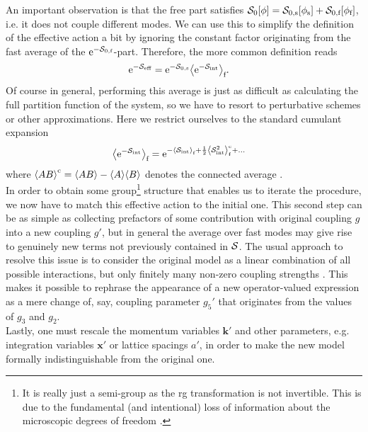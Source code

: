 An important observation is that the free part satisfies $\sact_0[\phi] = \sact_{0,\s}[\phi_\s] + \sact_{0,\f}[\phi_\f]$, i.e. it does not couple different modes.
We can use this to simplify the definition of the effective action a bit by ignoring the constant factor originating from the fast average of the $\powe{-\sact_{0,\f}}$-part.
Therefore, the more common definition reads \cite[]{Bosonization_Shankar_1994} %
\begin{align}
\powe{-\sact_\eff} &= \powe{-\sact_{0,\s}} \bra*{\powe{-\sact_\tint}}_\f. \label{eqn:rg:effective_S_Wilson_def}
\end{align}
Of course in general, performing this average is just as difficult as calculating the full partition function of the system, so we have to resort to perturbative schemes or other approximations.
Here we restrict ourselves to the standard cumulant expansion
\begin{align*}
\bra*{\powe{-\sact_\tint}}_\f &= \powe{-\bra*{\sact_\tint}_\f + \frac{1}{2} \bra*{\sact_\tint^2}_\f^\c + \dots}
\end{align*}
where $\bra*{AB}^\c = \bra*{AB} - \bra*{A}\bra*{B}$ denotes the connected average \cite{RG_Wilson_SmoothCutoff_Nozieres_1987}.\\
In order to obtain some group\footnote{It is really just a semi-group as the \gls{rg} transformation is not invertible. This is due to the fundamental (and intentional) loss of information about the microscopic degrees of freedom \cite[]{RG_Theory_Fisher_1998}.} structure that enables us to iterate the procedure, we now have to match this effective action to the initial one.
This second step can be as simple as collecting prefactors of some contribution with original coupling $g$ into a new coupling $g'$, but in general the average over fast modes may give rise to genuinely new terms not previously contained in $\sact$.
The usual approach to resolve this issue is to consider the original model as a linear combination of all possible interactions, but only finitely many non-zero coupling strengths \cite[]{Fradkin_2013}. %
This makes it possible to rephrase the appearance of a new operator-valued expression as a mere change of, say, coupling parameter $g_5'$ that originates from the values of $g_3$ and $g_2$.\\
Lastly, one must rescale the momentum variables $\textbf{k}'$ and other parameters, e.g. integration variables $\textbf{x}'$ or lattice spacings $a'$, in order to make the new model formally indistinguishable from the original one.
